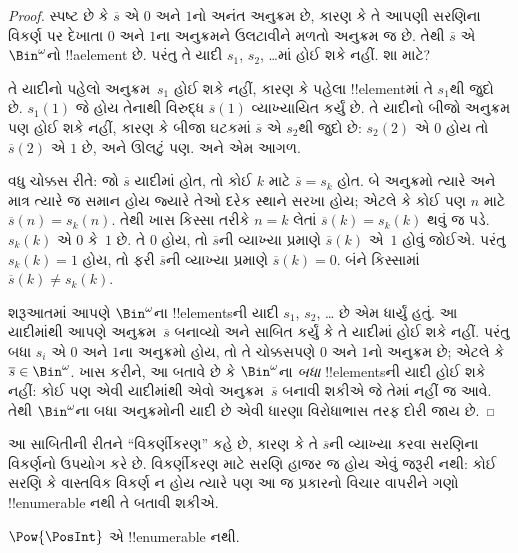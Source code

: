 \documentclass[../../../include/open-logic-section]{subfiles}
\begin{document}
\begin{proof}
સ્પષ્ટ છે કે $\overline{s}$ એ $0$ અને $1$નો અનંત અનુક્રમ છે,
કારણ કે તે આપણી સરણિના વિકર્ણ પર દેખાતા $0$ અને $1$ના
અનુક્રમને ઉલટાવીને મળતો અનુક્રમ જ છે. તેથી $\overline{s}$ એ
$\Bin^\omega$નો !!a{element} છે. પરંતુ તે યાદી
$s_1$, $s_2$, \dots{}માં હોઈ શકે નહીં. શા માટે?

તે યાદીનો પહેલો અનુક્રમ~$s_1$ હોઈ શકે નહીં, કારણ કે પહેલા
!!{element}માં તે $s_1$થી જુદો છે. $s_1(1)$ જે હોય તેનાથી
વિરુદ્ધ $\overline{s}(1)$ વ્યાખ્યાયિત કર્યું છે. તે યાદીનો
બીજો અનુક્રમ પણ હોઈ શકે નહીં, કારણ કે બીજા ઘટકમાં
$\overline{s}$ એ $s_2$થી જુદો છે: $s_2(2)$ એ $0$ હોય તો
$\overline{s}(2)$ એ $1$ છે, અને ઊલટું પણ. અને એમ આગળ.

વધુ ચોક્કસ રીતે: જો $\overline{s}$ યાદીમાં હોત, તો કોઈ $k$
માટે $\overline{s} = s_{k}$ હોત. બે અનુક્રમો ત્યારે અને માત્ર
ત્યારે જ સમાન હોય જ્યારે તેઓ દરેક સ્થાને સરખા હોય; એટલે કે કોઈ પણ
$n$ માટે $\overline{s}(n) = s_{k}(n)$. તેથી ખાસ કિસ્સા તરીકે
$n = k$ લેતાં $\overline{s}(k) = s_{k}(k)$ થવું જ પડે.
$s_k(k)$ એ $0$ કે~$1$ છે. તે $0$ હોય, તો $\overline{s}$ની
વ્યાખ્યા પ્રમાણે $\overline{s}(k)$ એ~$1$ હોવું જોઈએ. પરંતુ
$s_k(k) = 1$ હોય, તો ફરી $\overline{s}$ની વ્યાખ્યા પ્રમાણે
$\overline{s}(k) = 0$. બંને કિસ્સામાં
$\overline{s}(k) \neq s_{k}(k)$.

શરૂઆતમાં આપણે $\Bin^\omega$ના !!{element}sની યાદી
$s_1$, $s_2$, \dots{} છે એમ ધાર્યું હતું. આ યાદીમાંથી આપણે
અનુક્રમ~$\overline{s}$ બનાવ્યો અને સાબિત કર્યું કે તે યાદીમાં
હોઈ શકે નહીં. પરંતુ બધા $s_i$ એ $0$ અને $1$ના અનુક્રમો હોય,
તો તે ચોક્કસપણે $0$ અને $1$નો અનુક્રમ છે; એટલે કે
$\overline{s} \in \Bin^\omega$. ખાસ કરીને, આ બતાવે છે કે
$\Bin^\omega$ના \emph{બધા} !!{element}sની યાદી હોઈ શકે નહીં:
કોઈ પણ એવી યાદીમાંથી એવો અનુક્રમ~$\overline{s}$ બનાવી શકીએ
જે તેમાં નહીં જ આવે. તેથી $\Bin^\omega$ના બધા અનુક્રમોની યાદી
છે એવી ધારણા વિરોધાભાસ તરફ દોરી જાય છે.
\end{proof}

\begin{explain}
આ સાબિતીની રીતને ``વિકર્ણીકરણ'' કહે છે, કારણ કે તે
$\overline{s}$ની વ્યાખ્યા કરવા સરણિના વિકર્ણનો ઉપયોગ કરે છે.
વિકર્ણીકરણ માટે સરણિ હાજર જ હોય એવું જરૂરી નથી: કોઈ સરણિ કે
વાસ્તવિક વિકર્ણ ન હોય ત્યારે પણ આ જ પ્રકારનો વિચાર વાપરીને
ગણો !!{enumerable} નથી તે બતાવી શકીએ.
\end{explain}

\begin{thm}
$\Pow{\PosInt}$ એ !!{enumerable} નથી.
\end{thm}
\end{document}
